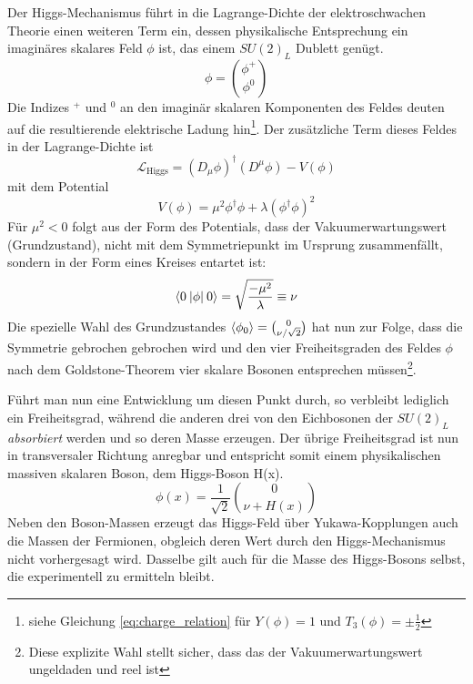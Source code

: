 Der Higgs-Mechanismus führt in die Lagrange-Dichte der elektroschwachen Theorie
einen weiteren Term ein, dessen physikalische Entsprechung ein imaginäres
skalares Feld $\phi$ ist, das einem $SU(2)_L$ Dublett genügt.
\begin{equation}
    \phi = \binom{\phi^+}{\phi^0}
\end{equation}
Die Indizes $^+$ und $^0$ an den imaginär skalaren Komponenten des Feldes
deuten auf die resultierende elektrische Ladung hin\footnote{siehe Gleichung
\ref{eq:charge_relation} für $Y(\phi)=1$ und $T_3(\phi)=\pm\tfrac{1}{2}$}.
Der zusätzliche Term dieses Feldes in der Lagrange-Dichte ist
\begin{equation}
    \mathcal{L}_\text{Higgs} = (D_\mu\phi)^\dagger(D^\mu\phi) - V(\phi)
\end{equation}
mit dem Potential
\begin{equation}
    V(\phi) = \mu^2\phi^\dagger\phi + \lambda (\phi^\dagger\phi )^2
\end{equation}
Für $\mu^2<0$ folgt aus der Form des Potentials, dass der Vakuumerwartungswert
(Grundzustand), nicht mit dem Symmetriepunkt im Ursprung zusammenfällt, sondern
in der Form eines Kreises entartet ist:
\begin{equation}
    \braket{0\:|\phi|\:0} = \sqrt{\frac{-\mu^2}{\lambda}} \equiv \nu 
\end{equation}
Die spezielle Wahl des Grundzustandes $\braket{\phi_0}=\binom{0}{\nu/\sqrt{2}}$
hat nun zur Folge, dass die Symmetrie gebrochen gebrochen wird und den vier
Freiheitsgraden des Feldes $\phi$ nach dem Goldstone-Theorem vier skalare
Bosonen entsprechen müssen\footnote{Diese explizite Wahl stellt sicher, dass
das der Vakuumerwartungswert ungeldaden und reel ist}.

Führt man nun eine Entwicklung um diesen Punkt durch, so verbleibt lediglich
ein Freiheitsgrad, während die anderen drei von den Eichbosonen der $SU(2)_L$
\textit{absorbiert} werden und so deren Masse erzeugen. Der übrige
Freiheitsgrad ist nun in transversaler Richtung anregbar und entspricht somit
einem physikalischen massiven skalaren Boson, dem Higgs-Boson H(x).
\begin{equation}
    \phi(x) = \frac{1}{\sqrt{2}}\binom{0}{\nu+H(x)}
\end{equation}
Neben den Boson-Massen erzeugt das Higgs-Feld über Yukawa-Kopplungen auch die
Massen der Fermionen, obgleich deren Wert durch den Higgs-Mechanismus nicht
vorhergesagt wird. Dasselbe gilt auch für die Masse des Higgs-Bosons selbst,
die experimentell zu ermitteln bleibt.



